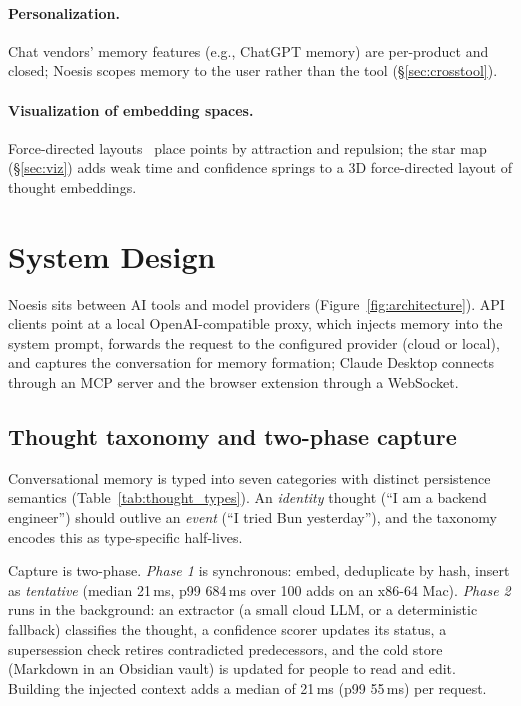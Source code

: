\documentclass[11pt]{article}
\begin{document}
\paragraph{Personalization.} Chat vendors' memory features (e.g., ChatGPT
memory) are per-product and closed; Noesis scopes memory to the user rather
than the tool (\S\ref{sec:crosstool}).

\paragraph{Visualization of embedding spaces.} Force-directed
layouts~\citep{forcedirected} place points by attraction and repulsion; the
star map (\S\ref{sec:viz}) adds weak time and confidence springs to a 3D
force-directed layout of thought embeddings.

\section{System Design}
\label{sec:system}

Noesis sits between AI tools and model providers (Figure~\ref{fig:architecture}).
API clients point at a local OpenAI-compatible proxy, which injects memory
into the system prompt, forwards the request to the configured provider
(cloud or local), and captures the conversation for memory formation;
Claude Desktop connects through an MCP server and the browser extension
through a WebSocket.

\subsection{Thought taxonomy and two-phase capture}
\label{sec:taxonomy}

Conversational memory is typed into seven categories with distinct
persistence semantics (Table~\ref{tab:thought_types}). An \emph{identity}
thought (``I am a backend engineer'') should outlive an \emph{event}
(``I tried Bun yesterday''), and the taxonomy encodes this as type-specific
half-lives.

Capture is two-phase. \emph{Phase 1} is synchronous: embed, deduplicate by
hash, insert as \emph{tentative} (median 21\,ms, p99 684\,ms over 100 adds on
an x86-64 Mac). \emph{Phase 2} runs in the background: an extractor (a small
cloud LLM, or a deterministic fallback) classifies the thought, a confidence
scorer updates its status, a supersession check retires contradicted
predecessors, and the cold store (Markdown in an Obsidian vault) is updated
for people to read and edit. Building the injected context adds a median of
21\,ms (p99 55\,ms) per request.
\end{document}
